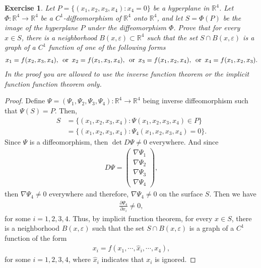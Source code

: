 \documentclass[11pt]{article}
\newtheorem{exercise}{Exercise}[section]
\theoremstyle{definition}
\numberwithin{equation}{subsection}
\begin{document}
\begin{exercise}{\rm *}
Let $P = \{(x_1, x_2, x_3, x_4): x_4 = 0\}$ be a hyperplane in $\mathbb{R}^4$. Let $\Phi: \mathbb{R}^4 \to \mathbb{R}^4$ be a $C^1$-diffeomorphism of $\mathbb{R}^4$ onto $\mathbb{R}^4$, and let $S = \Phi(P)$ be the image of the hyperplane $P$ under the diffeomorphism $\Phi$. Prove that for every $x \in S$, there is a neighborhood $B(x, \varepsilon) \subset \mathbb{R}^4$ such that the set $S\cap B(x, \varepsilon)$ is a graph of a $C^1$ function of one of the following forms
\begin{align*}
    x_1 = f(x_2, x_3, x_4), \,\,\, {\rm or} \,\,\, x_2 = f(x_1, x_3, x_4), \,\,\, {\rm or} \,\,\, x_3 = f(x_1, x_2, x_4), \,\,\, {\rm or} \,\,\, x_4 = f(x_1, x_2, x_3).
\end{align*}
In the proof you are allowed to use the inverse function theorem or the implicit function function theorem only.
\end{exercise}
\begin{proof}
Define $\Psi = (\Psi_1, \Psi_2, \Psi_3, \Psi_4): \mathbb{R}^4 \to \mathbb{R}^4$ being inverse diffeomorphism such that $\Psi(S) = P$. Then,
\begin{align*}
    S & = \{(x_1, x_2, x_3, x_4): \Psi(x_1, x_2, x_3, x_4) \in P\} \\
    & = \{(x_1, x_2, x_3, x_4): \Psi_4(x_1, x_2, x_3, x_4) = 0\}. 
\end{align*}
Since $\Psi$ is a diffeomorphism, then $\det D\Psi \neq 0$ everywhere. And since 
\begin{align*}
    D\Psi = \begin{pmatrix} 
    \nabla \Psi_1 \\
    \nabla \Psi_2 \\
    \nabla \Psi_3 \\
    \nabla \Psi_4
    \end{pmatrix},
\end{align*}
then $\nabla \Psi_4 \neq 0$ everywhere and therefore, $\nabla \Psi_4 \neq 0$ on the surface $S$. Then we have
\begin{align*}
    \frac{\partial \Psi_4}{\partial x_i} \neq 0,
\end{align*}
for some $i = 1,2,3,4$. Thus, by implicit function theorem, for every $x \in S$, there is a neighborhood $B(x, \varepsilon)$ such that the set $S \cap B(x, \varepsilon)$ is a graph of a $C^1$ function of the form 
\begin{align*}
    x_i = f(x_1, \cdots, \hat{x}_i, \cdots, x_4),
\end{align*}
for some $i = 1,2,3,4$, where $\hat{x}_i$ indicates that $x_i$ is ignored.
\end{proof}
\end{document}
